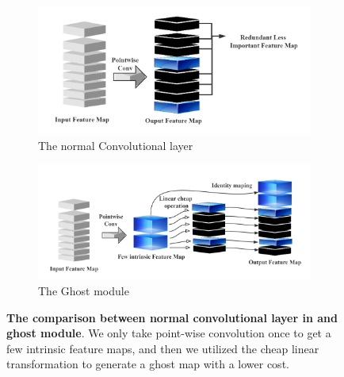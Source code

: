\begin{figure}[h]
	\begin{center}
		\begin{subfigure}[b]{0.49\textwidth}
			\includegraphics[width=\textwidth]{thesis-template-master/images/normal conv.png}
			\caption{The normal Convolutional layer}
			\label{fig:res18}
		\end{subfigure}
		\begin{subfigure}[b]{0.49\textwidth}
		    \centering
			\includegraphics[width=\textwidth]{thesis-template-master/images/ghostmodule.png}
			\caption{The Ghost module}
			\label{fig:cellnet}
		\end{subfigure}
	\end{center}
	\caption{\textbf{The comparison between normal convolutional layer in \cite{26}\cite{27}\cite{28} and ghost module}. We only take point-wise convolution once to get a few intrinsic feature maps, and then we utilized the cheap linear transformation to generate a ghost map with a lower cost.}
\end{figure}



